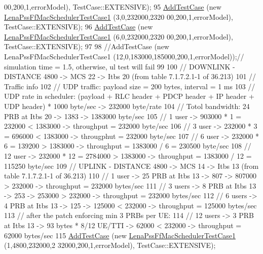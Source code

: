 \begin{DoxyCode}
      00,200,1,errorModel), TestCase::EXTENSIVE);
95   \hyperlink{classns3_1_1TestCase_a3718088e3eefd5d6454569d2e0ddd835}{AddTestCase} (\textcolor{keyword}{new} \hyperlink{classLenaPssFfMacSchedulerTestCase1}{LenaPssFfMacSchedulerTestCase1} (3,0,232000,2320
      00,200,1,errorModel), TestCase::EXTENSIVE);
96   \hyperlink{classns3_1_1TestCase_a3718088e3eefd5d6454569d2e0ddd835}{AddTestCase} (\textcolor{keyword}{new} \hyperlink{classLenaPssFfMacSchedulerTestCase1}{LenaPssFfMacSchedulerTestCase1} (6,0,232000,2320
      00,200,1,errorModel), TestCase::EXTENSIVE);
97 
98   \textcolor{comment}{//AddTestCase (new LenaPssFfMacSchedulerTestCase1 (12,0,183000,185000,200,1,errorModel));// simulation
       time = 1.5, otherwise, ul test will fail}
99 
100   \textcolor{comment}{// DOWNLINK - DISTANCE 4800 -> MCS 22 -> Itbs 20 (from table 7.1.7.2.1-1 of 36.213)}
101   \textcolor{comment}{// Traffic info}
102   \textcolor{comment}{//   UDP traffic: payload size = 200 bytes, interval = 1 ms}
103   \textcolor{comment}{//   UDP rate in scheduler: (payload + RLC header + PDCP header + IP header + UDP header) * 1000 byte/sec
       -> 232000 byte/rate }
104   \textcolor{comment}{// Totol bandwidth: 24 PRB at Itbs 20 -> 1383 -> 1383000 byte/sec}
105   \textcolor{comment}{// 1 user -> 903000 * 1 = 232000 < 1383000 -> throughput = 232000 byte/sec}
106   \textcolor{comment}{// 3 user -> 232000 * 3 = 696000 < 1383000 -> througphut = 232000 byte/sec}
107   \textcolor{comment}{// 6 user -> 232000 * 6 = 139200 > 1383000 -> throughput = 1383000 / 6 = 230500 byte/sec}
108   \textcolor{comment}{// 12 user -> 232000 * 12 = 2784000 > 1383000 -> throughput =  1383000 / 12 = 115250 byte/sec}
109   \textcolor{comment}{// UPLINK - DISTANCE 4800 -> MCS 14 -> Itbs 13 (from table 7.1.7.2.1-1 of 36.213)}
110   \textcolor{comment}{// 1 user -> 25 PRB at Itbs 13 -> 807 -> 807000 > 232000 -> throughput = 232000 bytes/sec}
111   \textcolor{comment}{// 3 users -> 8 PRB at Itbs 13 -> 253 -> 253000 > 232000 -> throughput = 232000 bytes/sec}
112   \textcolor{comment}{// 6 users -> 4 PRB at Itbs 13 -> 125 -> 125000 < 232000 -> throughput = 125000 bytes/sec}
113   \textcolor{comment}{// after the patch enforcing min 3 PRBs per UE:}
114   \textcolor{comment}{// 12 users -> 3 PRB at Itbs 13 -> 93  bytes * 8/12 UE/TTI  -> 62000 < 232000 -> throughput = 62000 
       bytes/sec}
115   \hyperlink{classns3_1_1TestCase_a3718088e3eefd5d6454569d2e0ddd835}{AddTestCase} (\textcolor{keyword}{new} \hyperlink{classLenaPssFfMacSchedulerTestCase1}{LenaPssFfMacSchedulerTestCase1} (1,4800,232000,2
      32000,200,1,errorModel), TestCase::EXTENSIVE);

\end{DoxyCode}
